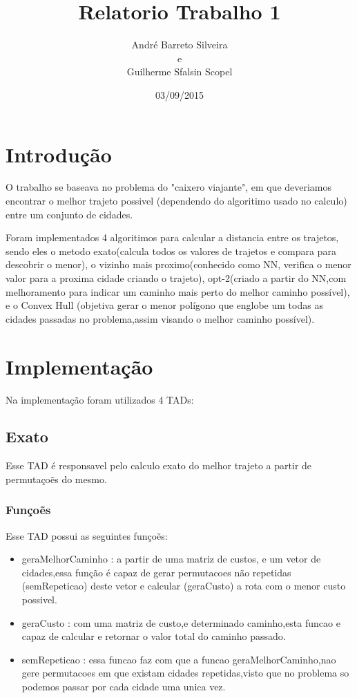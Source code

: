 \documentclass[a4paper,10pt]{article}
\title{Relatorio Trabalho 1}
\author{André Barreto Silveira \\e \\Guilherme Sfalsin Scopel}
\date{03/09/2015}
\begin{document}
\maketitle

 \section{Introdução}
  O trabalho se baseava no problema do "caixero viajante", em que deveriamos encontrar o melhor trajeto possivel (dependendo 
  do algoritimo usado no calculo) entre um conjunto de cidades.
  
  Foram implementados 4 algoritimos para calcular a distancia entre os trajetos, sendo eles o metodo exato(calcula todos os valores 
  de trajetos e compara para descobrir o menor), o vizinho mais proximo(conhecido como NN, verifica o menor valor para a proxima 
  cidade criando o trajeto), opt-2(criado a partir do NN,com melhoramento para indicar um caminho mais perto do melhor caminho possível),
  e o Convex Hull (objetiva gerar o menor polígono que englobe um todas as cidades passadas no problema,assim visando o melhor caminho possível).
  
 \section{Implementação}
 Na implementação foram utilizados 4 TADs:
 
 \subsection{Exato}
  Esse TAD é responsavel pelo calculo exato do melhor trajeto a partir de permutaço\~es do mesmo.
 
   \subsubsection{Funço\~es}
   Esse TAD possui as seguintes funço\~es: 
  
   \begin{itemize}
   \item geraMelhorCaminho : a partir de uma matriz de custos, e um vetor de cidades,essa função é capaz de 
   gerar permutacoes não repetidas (semRepeticao) deste vetor e calcular (geraCusto) a rota com o menor custo possivel.
   \item geraCusto : com uma matriz de custo,e determinado caminho,esta funcao e capaz de calcular e retornar o valor total do caminho passado.
   \item semRepeticao : essa funcao faz com que a funcao geraMelhorCaminho,nao gere permutacoes em que existam cidades repetidas,visto que no problema so podemos passar por cada cidade uma unica vez.
	\end{itemize}
  
\end{document}
